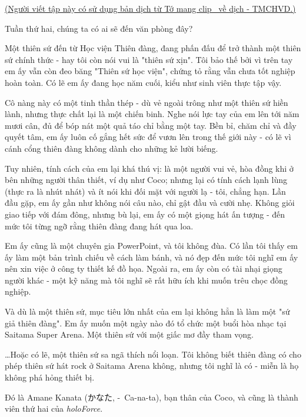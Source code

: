 \documentclass[../main.tex]{subfiles}
\begin{document}
\begin{center}
  \uline{(Người viết tập này có sử dụng bản dịch từ \href{https://www.youtube.com/@TomangclipHololivevedich}{Tớ mang clip \hll\ về dịch - TMCHVD}.)}
\end{center}


Tuần thứ hai, chúng ta có ai sẽ đến văn phòng đây?

Một thiên sứ đến từ Học viện Thiên đàng, đang phấn đấu để trở thành một thiên sứ chính thức - hay tôi còn nói vui là "thiên sứ xịn". Tôi bảo thế bởi vì trên tay em ấy vẫn còn đeo băng "Thiên sứ học viện", chứng tỏ rằng vẫn chưa tốt nghiệp hoàn toàn. Có lẽ em ấy đang học năm cuối, kiểu như sinh viên thực tập vậy.

Cô nàng này có một tinh thần thép - dù vẻ ngoài trông như một thiên sứ hiền lành, nhưng thực chất lại là một chiến binh. Nghe nói lực tay của em lên tới năm mươi cân, đủ để bóp nát một quả táo chỉ bằng một tay. Bền bỉ, chăm chỉ và đầy quyết tâm, em ấy luôn cố gắng hết sức để vươn lên trong thế giới này - có lẽ vì cánh cổng thiên đàng không dành cho những kẻ lười biếng.

Tuy nhiên, tính cách của em lại khá thú vị: là một người vui vẻ, hòa đồng khi ở bên những người thân thiết, ví dụ như Coco; nhưng lại có tính cách lạnh lùng (thực ra là nhút nhát) và ít nói khi đối mặt với người lạ - tôi, chẳng hạn. Lần đầu gặp, em ấy gần như không nói câu nào, chỉ gật đầu và cười nhẹ. Không giỏi giao tiếp với đám đông, nhưng bù lại, em ấy có một giọng hát ấn tượng - đến mức tôi từng ngỡ rằng thiên đàng đang hát qua loa.

Em ấy cũng là một chuyên gia PowerPoint, và tôi không đùa. Có lần tôi thấy em ấy làm một bản trình chiếu về cách làm bánh, và nó đẹp đến mức tôi nghĩ em ấy nên xin việc ở công ty thiết kế đồ họa. Ngoài ra, em ấy còn có tài nhại giọng người khác - một kỹ năng mà tôi nghĩ sẽ rất hữu ích khi muốn trêu chọc đồng nghiệp.

Và dù là một thiên sứ, mục tiêu lớn nhất của em lại không hẳn là làm một "sứ giả thiên đàng". Em ấy muốn một ngày nào đó tổ chức một buổi hòa nhạc tại Saitama Super Arena. Một thiên sứ với một giấc mơ đầy tham vọng.

\dots Hoặc có lẽ, một thiên sứ sa ngã thích nổi loạn. Tôi không biết thiên đàng có cho phép thiên sứ hát rock ở Saitama Arena không, nhưng tôi nghĩ là có - miễn là họ không phá hỏng thiết bị.

\chrint

Đó là Amane Kanata (かなた, -\ Ca-na-ta), bạn thân của Coco, và cũng là thành viên thứ hai của \textit{holoForce}.
\end{document}
